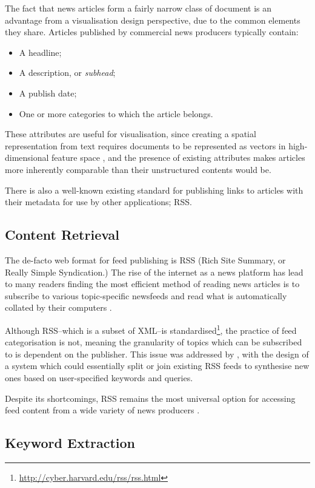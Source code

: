 The fact that news articles form a fairly narrow class of document is an advantage from a visualisation design perspective, due to the common elements they share. Articles published by commercial news producers typically contain:
\begin{itemize}[noitemsep]
	\item A headline;
	\item A description, or \textit{subhead};
	\item A publish date;
	\item One or more categories to which the article belongs.
\end{itemize}
These attributes are useful for visualisation, since creating a spatial representation from text requires documents to be represented as vectors in high-dimensional feature space \citep{VisualizingTheNonVisual}, and the presence of existing attributes makes articles more inherently comparable than their unstructured contents would be.

There is also a well-known existing standard for publishing links to articles with their metadata for use by other applications; RSS.

\subsection{Content Retrieval}
The de-facto web format for feed publishing is RSS (Rich Site Summary, or Really Simple Syndication.) The rise of the internet as a news platform has lead to many readers finding the most efficient method of reading news articles is to subscribe to various topic-specific newsfeeds and read what is automatically collated by their computers \citep{Nreader}.

Although RSS--which is a subset of XML--is standardised\footnote{\url{http://cyber.harvard.edu/rss/rss.html}}, the practice of feed categorisation is not, meaning the granularity of topics which can be subscribed to is dependent on the publisher. This issue was addressed by \citet{PersonalNewsRss}, with the design of a system which could essentially split or join existing RSS feeds to synthesise new ones based on user-specified keywords and queries.

Despite its shortcomings, RSS remains the most universal option for accessing feed content from a wide variety of news producers 
\citep{MiningAndVisualisingInformationFromRSSFeeds}.

\subsection{Keyword Extraction}


